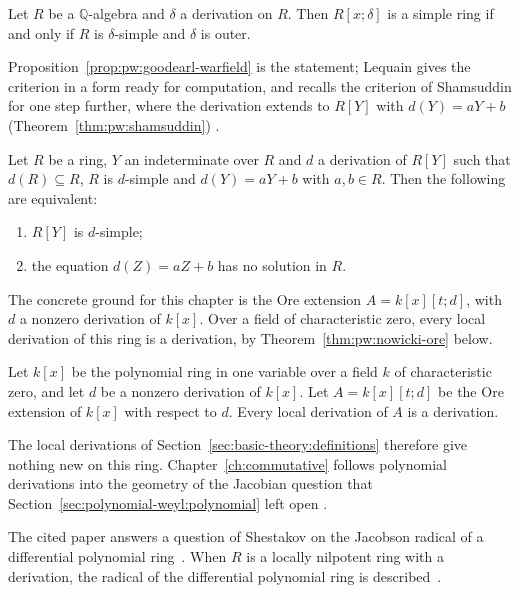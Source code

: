 \begin{proposition}
\label{prop:pw:goodearl-warfield}
Let $R$ be a $\mathbb{Q}$-algebra and $\delta$ a derivation on $R$. Then
$R[x;\delta]$ is a simple ring if and only if $R$ is $\delta$-simple and
$\delta$ is outer.
\end{proposition}

Proposition~\ref{prop:pw:goodearl-warfield} is the statement; Lequain gives
the criterion in a form ready for computation, and recalls the criterion of
Shamsuddin for one step further, where the derivation extends to $R[Y]$ with
$d(Y)=aY+b$ (Theorem~\ref{thm:pw:shamsuddin}) \cite[p.~802]{Lequain2008}.

\begin{theorem}
\label{thm:pw:shamsuddin}
Let $R$ be a ring, $Y$ an indeterminate over $R$ and $d$ a derivation of
$R[Y]$ such that $d(R)\subseteq R$, $R$ is $d$-simple and
$d(Y)=aY+b$ with $a,b\in R$. Then the following are equivalent:
\begin{enumerate}
\item $R[Y]$ is $d$-simple;
\item the equation $d(Z)=aZ+b$ has no solution in $R$.
\end{enumerate}
\end{theorem}

The concrete ground for this chapter is the Ore extension $A=k[x][t;d]$, with
$d$ a nonzero derivation of $k[x]$. Over a field of characteristic zero, every
local derivation of this ring is a derivation, by
Theorem~\ref{thm:pw:nowicki-ore} below.


\begin{theorem}
\label{thm:pw:nowicki-ore}
Let $k[x]$ be the polynomial ring in one variable over a field $k$ of
characteristic zero, and let $d$ be a nonzero derivation of $k[x]$. Let
$A=k[x][t;d]$ be the Ore extension of $k[x]$ with respect to $d$. Every
local derivation of $A$ is a derivation.
\end{theorem}

The local derivations of Section~\ref{sec:basic-theory:definitions} therefore
give nothing new on this ring. Chapter~\ref{ch:commutative} follows polynomial
derivations into the geometry of the Jacobian question that
Section~\ref{sec:polynomial-weyl:polynomial} left open
\cite[p.~1]{BelovKanelKontsevich2007}.

The cited paper answers a question of Shestakov on the Jacobson radical of a
differential polynomial ring~\cite{WlDifferentialPolynomialRingsOve2014}. When $R$ is a locally nilpotent ring with a
derivation, the radical of the differential polynomial ring is
described~\cite{WlDifferentialPolynomialRingsOve2014}.
